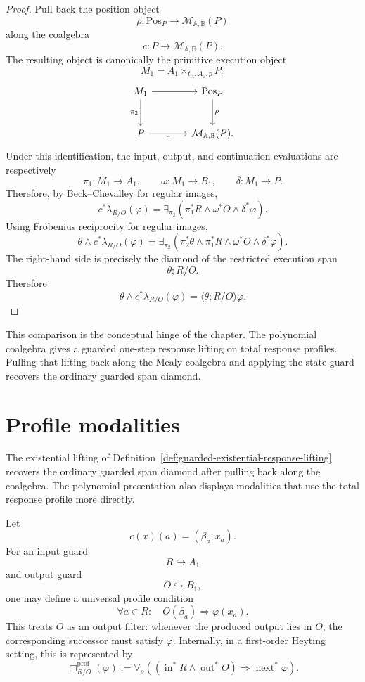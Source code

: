 \begin{proof}
Pull back the position object
\[
\rho:\mathrm{Pos}_P\to \mathcal M_{\mathbb A,\mathbb B}(P)
\]
along the coalgebra
\[
c:P\to\mathcal M_{\mathbb A,\mathbb B}(P).
\]
The resulting object is canonically the primitive execution object
\[
M_1=A_1\times_{t_A,A_0,p}P:
\]
\[
\begin{tikzcd}[column sep=large,row sep=large]
M_1
  \arrow[r]
  \arrow[d, "\pi_2"']
&
\mathrm{Pos}_P
  \arrow[d, "\rho"]
\\
P
  \arrow[r, "c"']
&
\mathcal M_{\mathbb A,\mathbb B}(P).
\end{tikzcd}
\]
Under this identification, the input, output, and continuation evaluations
are respectively
\[
\pi_1:M_1\to A_1,
\qquad
\omega:M_1\to B_1,
\qquad
\delta:M_1\to P.
\]
Therefore, by Beck--Chevalley for regular images,
\[
c^\ast\lambda_{R/O}(\varphi)
=
\exists_{\pi_2}
\left(
\pi_1^\ast R
\wedge
\omega^\ast O
\wedge
\delta^\ast\varphi
\right).
\]
Using Frobenius reciprocity for regular images,
\[
\theta\wedge c^\ast\lambda_{R/O}(\varphi)
=
\exists_{\pi_2}
\left(
\pi_2^\ast\theta
\wedge
\pi_1^\ast R
\wedge
\omega^\ast O
\wedge
\delta^\ast\varphi
\right).
\]
The right-hand side is precisely the diamond of the restricted execution
span
\[
\theta;R/O.
\]
Therefore
\[
\theta\wedge c^\ast\lambda_{R/O}(\varphi)
=
\langle \theta;R/O\rangle\varphi.
\]
\end{proof}

\begin{remark}
\label{rem:central-guarded-comparison}
This comparison is the conceptual hinge of the chapter. The polynomial
coalgebra gives a guarded one-step response lifting on total response
profiles. Pulling that lifting back along the Mealy coalgebra and applying
the state guard recovers the ordinary guarded span diamond.
\end{remark}

\section{Profile modalities}
\label{sec:profile-modalities}

The existential lifting of
Definition~\ref{def:guarded-existential-response-lifting} recovers the
ordinary guarded span diamond after pulling back along the coalgebra. The
polynomial presentation also displays modalities that use the total
response profile more directly.

Let
\[
c(x)(a)=(\beta_a,x_a).
\]
For an input guard
\[
R\hookrightarrow A_1
\]
and output guard
\[
O\hookrightarrow B_1,
\]
one may define a universal profile condition
\[
\forall a\in R:
\quad
O(\beta_a)\Rightarrow \varphi(x_a).
\]
This treats \(O\) as an output filter: whenever the produced output lies
in \(O\), the corresponding successor must satisfy \(\varphi\). Internally,
in a first-order Heyting setting, this is represented by
\[
\Box^{\mathrm{prof}}_{R/O}(\varphi)
:=
\forall_\rho
\left(
(\operatorname{in}^{\ast}R\wedge \operatorname{out}^{\ast}O)
\Rightarrow
\operatorname{next}^{\ast}\varphi
\right).
\]

